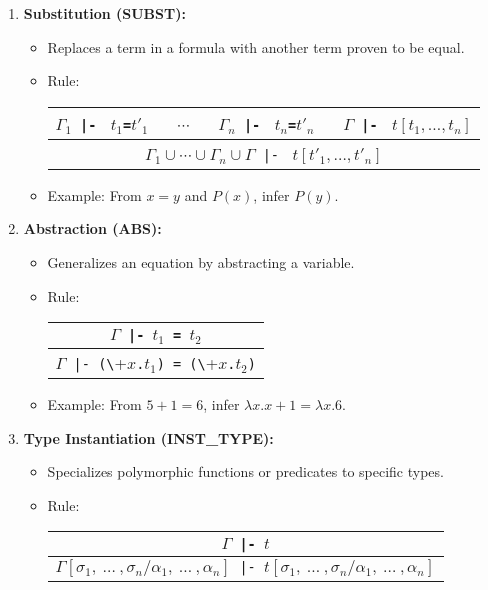 \begin{enumerate}
    \item \textbf{Substitution (SUBST):}
    \begin{itemize}
        \item Replaces a term in a formula with another term proven to be equal.
        \item Rule:
          \begin{center}
            \begin{tabular}{c}
              $\Gamma_1${\small\verb+ |- +} $t_1${\small\verb+=+}$t'_1$ {\small\verb+  +} $\cdots$ {\small\verb+  +}
              $\Gamma_n${\small\verb+ |- +} $t_n${\small\verb+=+}$t'_n$ {\small\verb+  +}
              $\Gamma${\small\verb+ |- +} $t[t_1,\ldots,t_n]$ \\ \hline
              $\Gamma_1 \cup \cdots
              \cup \Gamma_n \cup \Gamma${\small\verb+ |- +} $t[t'_1,\ldots,t'_n]$ \\
            \end{tabular}
          \end{center}
        \item Example: From \(x = y\) and \(P(x)\), infer \(P(y)\).
    \end{itemize}

    \item \textbf{Abstraction (ABS):}
    \begin{itemize}
        \item Generalizes an equation by abstracting a variable.
        \item Rule:
          \begin{center}
            \begin{tabular}{c}
              $\Gamma${\small\verb+ |- +}$t_1${\small\verb+ = +}$t_2$ \\ \hline
              $\Gamma${\small\verb+ |- (\+}$x${\small\verb+.+}$t_1${\small\verb+) = (\+}$x${\small\verb+.+}$t_2${\small\verb+)+} \\
            \end{tabular}
          \end{center}
        \item Example: From \(5 + 1 = 6\), infer \(\lambda x. x + 1 = \lambda x. 6\).
    \end{itemize}

    \item \textbf{Type Instantiation (INST\_TYPE):}
    \begin{itemize}
        \item Specializes polymorphic functions or predicates to specific types.
        \item Rule:
          \begin{center}
            \begin{tabular}{c}
              $\Gamma${\small\verb+ |- +}$t$ \\ \hline
              $\Gamma[\sigma_1,\ \ldots\ ,\sigma_n/\alpha_1,\ \ldots\ ,\alpha_n]${\small\verb+ |- +}$t[\sigma_1,\ \ldots\ ,\sigma_n/\alpha_1,\ \ldots\ ,\alpha_n]$
            \end{tabular}
          \end{center}
    \end{itemize}


\end{enumerate}
